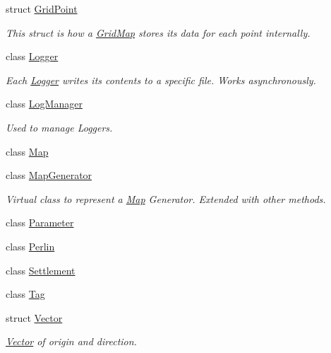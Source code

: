 \begin{DoxyCompactItemize}
struct \mbox{\hyperlink{struct_world_architect_1_1_grid_point}{Grid\+Point}}
\begin{DoxyCompactList}\small\item\em This struct is how a \mbox{\hyperlink{class_world_architect_1_1_grid_map}{Grid\+Map}} stores its data for each point internally. \end{DoxyCompactList}\item 
class \mbox{\hyperlink{class_world_architect_1_1_logger}{Logger}}
\begin{DoxyCompactList}\small\item\em Each \mbox{\hyperlink{class_world_architect_1_1_logger}{Logger}} writes it\textquotesingle{}s contents to a specific file. Works asynchronously. \end{DoxyCompactList}\item 
class \mbox{\hyperlink{class_world_architect_1_1_log_manager}{Log\+Manager}}
\begin{DoxyCompactList}\small\item\em Used to manage Loggers. \end{DoxyCompactList}\item 
class \mbox{\hyperlink{class_world_architect_1_1_map}{Map}}
\item 
class \mbox{\hyperlink{class_world_architect_1_1_map_generator}{Map\+Generator}}
\begin{DoxyCompactList}\small\item\em Virtual class to represent a \mbox{\hyperlink{class_world_architect_1_1_map}{Map}} Generator. Extended with other methods. \end{DoxyCompactList}\item 
class \mbox{\hyperlink{class_world_architect_1_1_parameter}{Parameter}}
\item 
class \mbox{\hyperlink{class_world_architect_1_1_perlin}{Perlin}}
\item 
class \mbox{\hyperlink{class_world_architect_1_1_settlement}{Settlement}}
\item 
class \mbox{\hyperlink{class_world_architect_1_1_tag}{Tag}}
\item 
struct \mbox{\hyperlink{struct_world_architect_1_1_vector}{Vector}}
\begin{DoxyCompactList}\small\item\em \mbox{\hyperlink{struct_world_architect_1_1_vector}{Vector}} of origin and direction. \end{DoxyCompactList}\end{DoxyCompactItemize}
